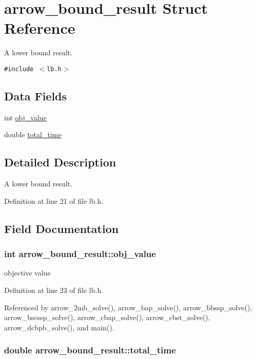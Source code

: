\hypertarget{structarrow__bound__result}{
\section{arrow\_\-bound\_\-result Struct Reference}
\label{structarrow__bound__result}
}
A lower bound result.  


{\tt \#include $<$lb.h$>$}

\subsection*{Data Fields}
\begin{CompactItemize}
\item 
int \hyperlink{structarrow__bound__result_acbca68de984376a60dbb9893935e0f4}{obj\_\-value}
\item 
double \hyperlink{structarrow__bound__result_d27a3cae43bbe1ed2e2c60a4ef307b08}{total\_\-time}
\end{CompactItemize}


\subsection{Detailed Description}
A lower bound result. 

Definition at line 21 of file lb.h.

\subsection{Field Documentation}
\hypertarget{structarrow__bound__result_acbca68de984376a60dbb9893935e0f4}{
\subsubsection{\setlength{\rightskip}{0pt plus 5cm}int {\bf arrow\_\-bound\_\-result::obj\_\-value}}}
\label{structarrow__bound__result_acbca68de984376a60dbb9893935e0f4}


objective value 

Definition at line 23 of file lb.h.

Referenced by arrow\_\-2mb\_\-solve(), arrow\_\-bap\_\-solve(), arrow\_\-bbssp\_\-solve(), arrow\_\-bscssp\_\-solve(), arrow\_\-cbap\_\-solve(), arrow\_\-cbst\_\-solve(), arrow\_\-dcbpb\_\-solve(), and main().\hypertarget{structarrow__bound__result_d27a3cae43bbe1ed2e2c60a4ef307b08}{
\subsubsection{\setlength{\rightskip}{0pt plus 5cm}double {\bf arrow\_\-bound\_\-result::total\_\-time}}}
\label{structarrow__bound__result_d27a3cae43bbe1ed2e2c60a4ef307b08}


